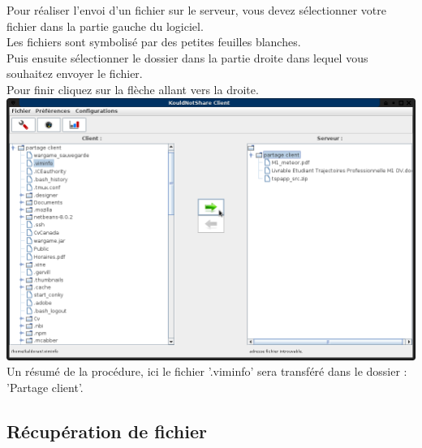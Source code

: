\documentclass[12pt,a4paper]{article}
\begin{document}
\begin{center}
	Pour réaliser l'envoi d'un fichier sur le serveur, vous devez sélectionner  votre fichier dans la partie gauche du logiciel. \\
	Les fichiers sont symbolisé par des petites feuilles blanches. \\
	Puis ensuite sélectionner le dossier dans la partie droite dans lequel vous souhaitez envoyer le fichier. \\
	Pour finir cliquez sur la flèche allant vers la droite. \\
	\includegraphics[scale=0.4]{images/envoi.png}
	Un résumé de la procédure, ici le fichier '.viminfo' sera transféré dans le dossier : 'Partage client'. 

\end{center}

\subsection{Récupération de fichier}
\end{document}
